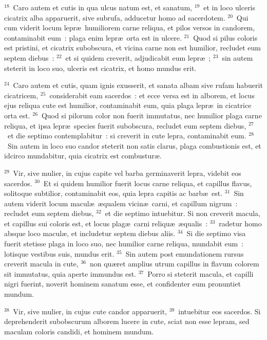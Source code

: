${}^{18}$~Caro autem et cutis in qua ulcus natum est, et sanatum,
${}^{19}$~et in loco ulceris cicatrix alba apparuerit, sive subrufa, adducetur homo ad sacerdotem.
${}^{20}$~Qui cum viderit locum lepr\ae\ humiliorem carne reliqua, et pilos versos in candorem, contaminabit eum~: plaga enim lepr\ae\ orta est in ulcere.
${}^{21}$~Quod si pilus coloris est pristini, et cicatrix subobscura, et vicina carne non est humilior, recludet eum septem diebus~:
${}^{22}$~et si quidem creverit, adjudicabit eum lepr\ae~;
${}^{23}$~sin autem steterit in loco suo, ulceris est cicatrix, et homo mundus erit.


${}^{24}$~Caro autem et cutis, quam ignis exusserit, et sanata albam sive rufam habuerit cicatricem,
${}^{25}$~considerabit eam sacerdos~: et ecce versa est in alborem, et locus ejus reliqua cute est humilior, contaminabit eum, quia plaga lepr\ae\ in cicatrice orta est.
${}^{26}$~Quod si pilorum color non fuerit immutatus, nec humilior plaga carne reliqua, et ipsa lepr\ae\ species fuerit subobscura, recludet eum septem diebus,
${}^{27}$~et die septimo contemplabitur~: si creverit in cute lepra, contaminabit eum.
${}^{28}$~Sin autem in loco suo candor steterit non satis clarus, plaga combustionis est, et idcirco mundabitur, quia cicatrix est combustur\ae .


${}^{29}$~Vir, sive mulier, in cujus capite vel barba germinaverit lepra, videbit eos sacerdos.
${}^{30}$~Et si quidem humilior fuerit locus carne reliqua, et capillus flavus, solitoque subtilior, contaminabit eos, quia lepra capitis ac barb\ae\ est.
${}^{31}$~Sin autem viderit locum macul\ae\ \ae qualem vicin\ae\ carni, et capillum nigrum~: recludet eum septem diebus,
${}^{32}$~et die septimo intuebitur. Si non creverit macula, et capillus sui coloris est, et locus plag\ae\ carni reliqu\ae\ \ae qualis~:
${}^{33}$~radetur homo absque loco macul\ae , et includetur septem diebus aliis.
${}^{34}$~Si die septimo visa fuerit stetisse plaga in loco suo, nec humilior carne reliqua, mundabit eum~: lotisque vestibus suis, mundus erit.
${}^{35}$~Sin autem post emundationem rursus creverit macula in cute,
${}^{36}$~non qu\ae ret amplius utrum capillus in flavum colorem sit immutatus, quia aperte immundus est.
${}^{37}$~Porro si steterit macula, et capilli nigri fuerint, noverit hominem sanatum esse, et confidenter eum pronuntiet mundum.


${}^{38}$~Vir, sive mulier, in cujus cute candor apparuerit,
${}^{39}$~intuebitur eos sacerdos. Si deprehenderit subobscurum alborem lucere in cute, sciat non esse lepram, sed maculam coloris candidi, et hominem mundum.


